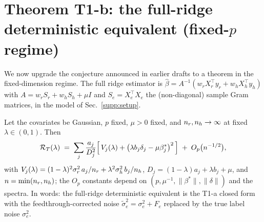 \section{Theorem T1-b: the full-ridge deterministic equivalent (fixed-$p$ regime)}
\label{supp:t1b}

We now upgrade the conjecture announced in earlier drafts to a theorem in the fixed-dimension regime.
The full ridge estimator is $\hat\beta = A^{-1}(w_r X_r^\top y_r + w_h X_h^\top y_h)$ with $A = w_r S_r + w_h S_h + \mu I$ and $S_e = X_e^\top X_e$ the (non-diagonal) sample Gram matrices, in the model of Sec.~\ref{supp:setup}.

\begin{theorem}[T1-b]\label{supp:thm:t1b}
Let the covariates be Gaussian, $p$ fixed, $\mu > 0$ fixed, and $n_r, n_h \to \infty$ at fixed $\lambda \in (0,1)$.
Then
\begin{equation}
\mathcal{R}_T(\lambda) \;=\; \sum_j \frac{a_j}{D_j^2}\Big[\, V_j(\lambda) + \big(\lambda b_j\delta_j - \mu\beta^*_j\big)^2 \,\Big] \;+\; O_p\big(n^{-1/2}\big),
\label{supp:eq:t1b}
\end{equation}
with $V_j(\lambda) = (1-\lambda)^2\sigma_r^2\, a_j/n_r + \lambda^2\sigma_h^2\, b_j/n_h$, $D_j = (1-\lambda)a_j + \lambda b_j + \mu$, and $n = \min(n_r, n_h)$; the $O_p$ constants depend on $(p, \mu^{-1}, \|\beta^*\|, \|\delta\|)$ and the spectra.
In words: the full-ridge deterministic equivalent is the T1-a closed form with the feedthrough-corrected noise $\tilde\sigma_e^2 = \sigma_e^2 + F_e$ replaced by the true label noise $\sigma_e^2$.
\end{theorem}

